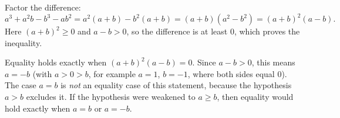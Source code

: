 Factor the difference:
\[
a^3+a^2b-b^3-ab^2=a^2(a+b)-b^2(a+b)=(a+b)(a^2-b^2)=(a+b)^2(a-b).
\]
Here $(a+b)^2\ge0$ and $a-b>0$, so the difference is at least $0$, which proves the inequality.

Equality holds exactly when $(a+b)^2(a-b)=0$. Since $a-b>0$, this means $\boxed{a=-b}$ (with $a>0>b$, for example $a=1$, $b=-1$, where both sides equal $0$). The case $a=b$ is \emph{not} an equality case of this statement, because the hypothesis $a>b$ excludes it. If the hypothesis were weakened to $a\ge b$, then equality would hold exactly when $a=b$ or $a=-b$.
